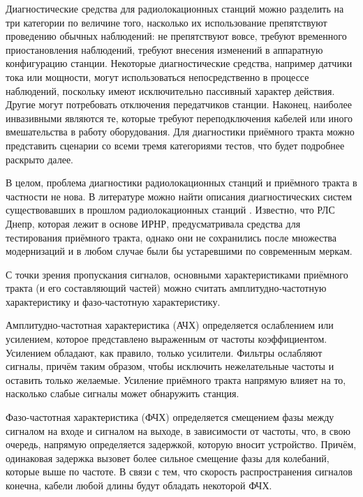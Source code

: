 \documentclass{report}
\begin{document}
Диагностические средства для радиолокационных станций можно разделить на три категории по величине того, насколько их использование препятствуют проведению обычных наблюдений: не препятствуют вовсе, требуют временного приостановления наблюдений, требуют внесения изменений в аппаратную конфигурацию станции. Некоторые диагностические средства, например датчики тока или мощности, могут использоваться непосредственно в процессе наблюдений, поскольку имеют исключительно пассивный характер действия. Другие могут потребовать отключения передатчиков станции. Наконец, наиболее инвазивными являются те, которые требуют переподключения кабелей или иного вмешательства в работу оборудования. Для диагностики приёмного тракта можно представить сценарии со всеми тремя категориями тестов, что будет подробнее раскрыто далее.

В целом, проблема диагностики радиолокационных станций и приёмного тракта в частности не нова. В литературе можно найти описания диагностических систем существовавших в прошлом радиолокационных станций \cite{abm}. Известно, что РЛС Днепр, которая лежит в основе ИРНР, предусматривала средства для тестирования приёмного тракта, однако они не сохранились после множества модернизаций и в любом случае были бы устаревшими по современным меркам.

С точки зрения пропускания сигналов, основными характеристиками  приёмного тракта (и его составляющий частей) можно считать амплитудно-частотную характеристику и фазо-частотную характеристику.

Амплитудно-частотная характеристика (АЧХ) определяется ослаблением или усилением, которое представлено выраженным от частоты коэффициентом. Усилением обладают, как правило, только усилители. Фильтры ослабляют сигналы, причём таким образом, чтобы исключить нежелательные частоты и оставить только желаемые. Усиление приёмного тракта напрямую влияет на то, насколько слабые сигналы может обнаружить станция.

Фазо-частотная характеристика (ФЧХ) определяется смещением фазы между сигналом на входе и сигналом на выходе, в зависимости от частоты, что, в свою очередь, напрямую определяется задержкой, которую вносит устройство. Причём, одинаковая задержка вызовет более сильное смещение фазы для колебаний, которые выше по частоте. В связи с тем, что скорость распространения сигналов конечна, кабели любой длины будут обладать некоторой ФЧХ.
\end{document}
